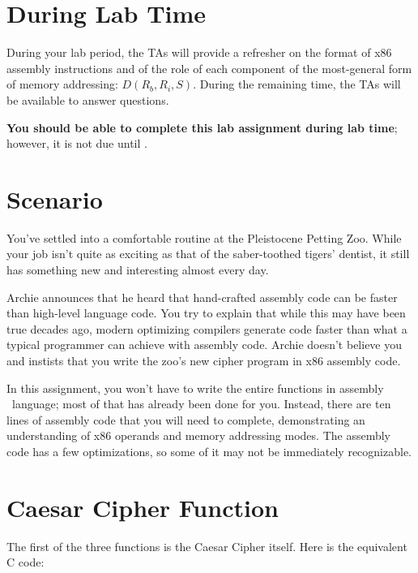 \section*{During Lab Time}

During your lab period, the TAs will provide a refresher on the format of x86
assembly instructions and of the role of each component of the most-general
form of memory addressing: $D(R_b, R_i, S)$. During the remaining time, the TAs
will be available to answer questions.

\textbf{You should be able to complete this lab assignment during lab time};
however, it is not due until \duedate.

\section*{Scenario}

You've settled into a comfortable routine at the Pleistocene Petting Zoo. While
your job isn't quite as exciting as that of the saber-toothed tigers' dentist,
it still has something new and interesting almost every day.

Archie announces that he heard that hand-crafted assembly code can be faster
than high-level language code. You try to explain that while this may have been
true decades ago, modern optimizing compilers generate code faster than what a
typical programmer can achieve with assembly code. Archie doesn't believe you
and instists that you write the zoo's new cipher program in x86 assembly code.

\hspace{1cm}

In this assignment, you won't have to write the entire functions in assembly \
language; most of that has already been done for you. Instead, there are ten
lines of assembly code that you will need to complete, demonstrating an
understanding of x86 operands and memory addressing modes. The assembly code
has a few optimizations, so some of it may not be immediately recognizable.


\section{Caesar Cipher Function}

The first of the three functions is the Caesar Cipher itself. Here is the
equivalent C code:



